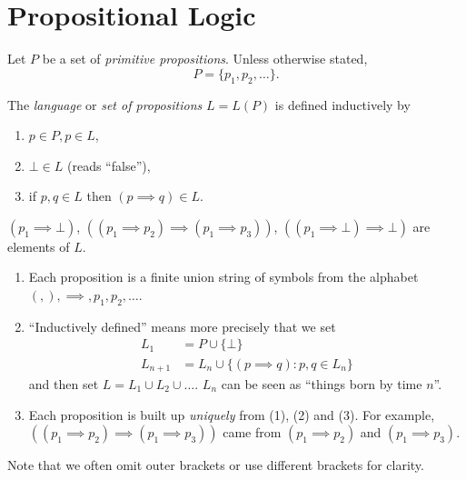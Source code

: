 \documentclass[a4paper]{article}
\begin{document}


\tableofcontents

\section{Propositional Logic}

Let \(P\) be a set of \emph{primitive propositions}. Unless otherwise stated,
\[
  P = \{p_1, p_2, \dots \}.
\]

\begin{definition}[Language]
  The \emph{language} or \emph{set of propositions} \(L = L(P)\) is defined inductively by
  \begin{enumerate}
  \item \( p \in P, p \in L\),
  \item \(\bot \in L\) (reads ``false''),
  \item if \(p, q \in L\) then \((p \implies q) \in L\).
  \end{enumerate}
\end{definition}

\begin{eg}
  \((p_1 \implies \bot)\), \(((p_1 \implies p_2) \implies (p_1 \implies p_3))\), \(((p_1 \implies \bot) \implies \bot)\) are elements of \(L\).
\end{eg}

\begin{note}\leavevmode
  \begin{enumerate}
  \item Each proposition is a finite union string of symbols from the alphabet \((, ), \implies, p_1, p_2, \dots\).
  \item ``Inductively defined'' means more precisely that we set
    \begin{align*}
      L_1 &= P \cup \{\bot\} \\
      L_{n + 1} &= L_n \cup \{(p \implies q): p, q \in L_n\}
    \end{align*}
    and then set \(L = L_1 \cup L_2 \cup \dots\). \(L_n\) can be seen as ``things born by time \(n\)''.
  \item Each proposition is built up \emph{uniquely} from (1), (2) and (3). For example, \(((p_1 \implies p_2) \implies (p_1 \implies p_3))\) came from \((p_1 \implies p_2)\) and \((p_1 \implies p_3)\).
  \end{enumerate}
\end{note}

Note that we often omit outer brackets or use different brackets for clarity.
\end{document}
